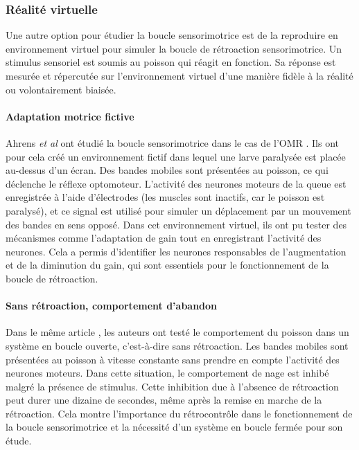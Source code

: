 
\subsubsection{Réalité virtuelle}

Une autre option pour étudier la boucle sensorimotrice est de la reproduire en environnement virtuel pour simuler la boucle de rétroaction sensorimotrice. Un stimulus sensoriel est soumis au poisson qui réagit en fonction. Sa réponse est mesurée et répercutée sur l'environnement virtuel d'une manière fidèle à la réalité ou volontairement biaisée.

\paragraph{Adaptation motrice fictive}
Ahrens \emph{et al} ont étudié la boucle sensorimotrice dans le cas de l'OMR \cite{ahrens_brain-wide_2012}. Ils ont pour cela créé un environnement fictif dans lequel une larve paralysée est placée au-dessus d'un écran. Des bandes mobiles sont présentées au poisson, ce qui déclenche le réflexe optomoteur. L'activité des neurones moteurs de la queue est enregistrée à l'aide d'électrodes (les muscles sont inactifs, car le poisson est paralysé), et ce signal est utilisé pour simuler un déplacement par un mouvement des bandes en sens opposé. Dans cet environnement virtuel, ils ont pu tester des mécanismes comme l'adaptation de gain tout en enregistrant l'activité des neurones. Cela a permis d'identifier les neurones responsables de l'augmentation et de la diminution du gain, qui sont essentiels pour le fonctionnement de la boucle de rétroaction.

\paragraph{Sans rétroaction, comportement d'abandon} %
Dans le même article \cite{ahrens_brain-wide_2012}, les auteurs ont testé le comportement du poisson dans un système en boucle ouverte, c'est-à-dire sans rétroaction. Les bandes mobiles sont présentées au poisson à vitesse constante sans prendre en compte l'activité des neurones moteurs. Dans cette situation, le comportement de nage est inhibé malgré la présence de stimulus. Cette inhibition due à l'absence de rétroaction peut durer une dizaine de secondes, même après la remise en marche de la rétroaction. Cela montre l'importance du rétrocontrôle dans le fonctionnement de la boucle sensorimotrice et la nécessité d'un système en boucle fermée pour son étude. 

